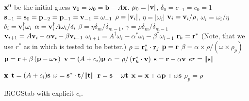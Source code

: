 \begin{algorithm}[H]
\begin{algorithmic}
\State ${\bf x}^0$ be the initial guess
\State ${\bf v}_0 = \omega _ 0 = {\bf b}- A {\bf x}$.
\State $\mu _0 = |{\bf v}|$, $\delta _0 = c_{-1}=c_0=1$
\State ${\bf s}_{-1}={\bf s}_0={\bf p}_{-2}={\bf p}_{-1}={\bf v}_{-1}=\omega _{-1}$
    \State $\rho =|{\bf v}_i|$, $\eta  = |\omega _i|$ ${\bf v}_i={\bf v}_i / \rho $, $\omega _i = \omega _i / \eta$
    \State $\delta _i = {\bf v}_i^{\dagger} \omega _i$
    \State $\alpha  = {\bf v}_i^{\dagger} A \omega _i / \delta _i$
    \State $\beta = \eta \delta _m / \delta _{m-1}$, $\gamma = \rho \delta _m / \delta _{m-1}$
    \State ${\bf v}_{i+1}=A {\bf v}_i -\alpha {\bf v}_i - \beta {\bf v}_{i-1}$
    \State ${\omega}_{i+1}=A^{\dagger} {\omega}_i -\alpha^* {\omega}_i - \beta^* {\omega}_{i-1}$
    \State ${\bf r}_h={\bf r}^*$ (Note, that we use $r^*$ as in \cite{sparselinearbook1} which is tested to be better.)
        \State $\rho = {\bf r}_h^* \cdot {\bf r}_j$
            \State ${\bf p}={\bf r}$
        \Else
            \State $\beta = \alpha \times \rho / (\omega \times \rho_p)$
            \State ${\bf p}={\bf r}+\beta\left({\bf p}-\omega {\bf v}\right)$
        \EndIf
        \State ${\bf v}=(A+c_i){\bf p}$
        \State $\alpha = \rho / \left({\bf r}_h^*\cdot {\bf v}\right)$
        \State ${\bf s}={\bf r}-\alpha {\bf v}$
            \State $er=\|{\bf s}\|$

                \Return ${\bf x}$
            \EndIf
        \EndIf
        \State ${\bf t}=(A+c_i){\bf s}$
        \State $\omega = {\bf s}^*\cdot {\bf t}/\|{\bf t}\|$
        \State ${\bf r}={\bf s}-\omega {\bf t}$
        \State ${\bf x}={\bf x}+\alpha {\bf p}+\omega {\bf s}$
        \State $\rho _p=\rho$
    \EndFor
\EndFor
\end{algorithmic}
\caption{\label{alg.BiCGStabExplicit}BiCGStab with explicit $c_i$.}
\end{algorithm}
